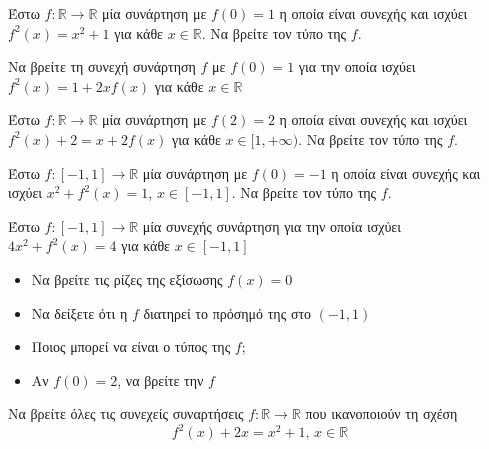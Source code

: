 \documentclass{presentation}
\begin{document}
\begin{askisi}
  Έστω $f:\mathbb{R}\to\mathbb{R}$ μία συνάρτηση με $f(0)=1$ η οποία είναι συνεχής και ισχύει $f^2(x)=x^2+1$ για κάθε $x\in\mathbb{R}$. Να βρείτε τον τύπο της $f$.
\end{askisi}

\begin{askisi}
  Να βρείτε τη συνεχή συνάρτηση $f$ με $f(0)=1$ για την οποία ισχύει $f^2(x)=1+2xf(x)$ για κάθε $x\in\mathbb{R}$
\end{askisi}

\begin{askisi}
  Έστω $f:\mathbb{R}\to\mathbb{R}$ μία συνάρτηση με $f(2)=2$ η οποία είναι συνεχής και ισχύει $f^2(x)+2=x+2f(x)$ για κάθε $x\in [1,+\infty)$. Να βρείτε τον τύπο της $f$.
\end{askisi}

\begin{askisi}
  Έστω $f:[-1,1]\to\mathbb{R}$ μία συνάρτηση με $f(0)=-1$ η οποία είναι συνεχής και ισχύει $x^2+f^2(x)=1$, $x\in [-1,1]$. Να βρείτε τον τύπο της $f$.
\end{askisi}

\begin{askisi}
  Έστω $f:[-1,1]\to\mathbb{R}$ μία συνεχής συνάρτηση για την οποία ισχύει $4x^2+f^2(x)=4$ για κάθε $x\in [-1,1]$
  \begin{itemize}[<+->]
    \item Να βρείτε τις ρίζες της εξίσωσης $f(x)=0$
    \item Να δείξετε ότι η $f$ διατηρεί το πρόσημό της στο $(-1,1)$
    \item Ποιος μπορεί να είναι ο τύπος της $f$;
    \item Αν $f(0)=2$, να βρείτε την $f$
  \end{itemize}
\end{askisi}

\begin{askisi}
  Να βρείτε όλες τις συνεχείς συναρτήσεις $f:\mathbb{R}\to\mathbb{R}$ που ικανοποιούν τη σχέση
  $$f^2(x)+2x=x^2+1 \text{, } x\in\mathbb{R}$$
\end{askisi}
\end{document}
